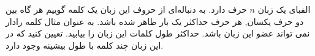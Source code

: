 \EXERCISE
الفبای یک زبان
$n$
حرف دارد. به دنباله‌ای از حروف این زبان یک کلمه گوییم هر گاه بین دو حرف یکسان, هر حرف حداکثر یک بار ظاهر شده باشد. به عنوان مثال کلمه رادار نمی تواند عضو این زبان باشد. حداکثر طول کلمات این زبان را بیابید. تعیین کنید که در این زبان چند کلمه با طول بیشینه وجود دارد.